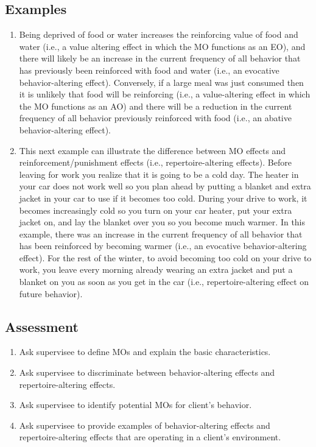 \subsection{Examples}
\begin{enumerate}
\item Being deprived of food or water increases the reinforcing value of food and water (i.e., a value altering effect in which the MO functions as an EO), and there will likely be an increase in the current frequency of all behavior that has previously been reinforced with food and water (i.e., an evocative behavior-altering effect).  Conversely, if a large meal was just consumed then it is unlikely that food will be reinforcing (i.e., a value-altering effect in which the MO functions as an AO) and there will be a reduction in the current frequency of all behavior previously reinforced with food (i.e., an abative behavior-altering effect).
\item This next example can illustrate the difference between MO effects and reinforcement/punishment effects (i.e., repertoire-altering effects).  Before leaving for work you realize that it is going to be a cold day.  The heater in your car does not work well so you plan ahead by putting a blanket and extra jacket in your car to use if it becomes too cold. During your drive to work, it becomes increasingly cold so you turn on your car heater, put your extra jacket on, and lay the blanket over you so you become much warmer.  In this example, there was an increase in the current frequency of all behavior that has been reinforced by becoming warmer (i.e., an evocative behavior-altering effect).  For the rest of the winter, to avoid becoming too cold on your drive to work, you leave every morning already wearing an extra jacket and put a blanket on you as soon as you get in the car (i.e., repertoire-altering effect on future behavior).  
%
\end{enumerate}
%
\subsection{Assessment}
\begin{enumerate}
\item Ask supervisee to define MOs and explain the basic characteristics.
\item Ask supervisee to discriminate between behavior-altering effects and repertoire-altering effects.
\item Ask supervisee to identify potential MOs for client's behavior.
\item Ask supervisee to provide examples of behavior-altering effects and repertoire-altering effects that are operating in a client's environment.
\end{enumerate}
%
